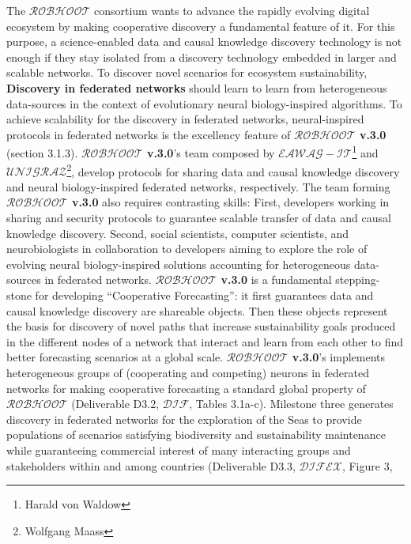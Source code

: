 \documentclass[11pt, a4paper]{article} %
\begin{document}
  The {\bf $\mathcal{ROBHOOT}$} consortium wants to advance the
  rapidly evolving digital ecosystem by making cooperative discovery a
  fundamental feature of it. For this purpose, a science-enabled data
  and causal knowledge discovery technology is not enough if they stay
  isolated from a discovery technology embedded in larger and scalable
  networks. To discover novel scenarios for ecosystem sustainability,
  {\bf Discovery in federated networks} should learn to learn from
  heterogeneous data-sources in the context of evolutionary neural
  biology-inspired algorithms. To achieve scalability for the
  discovery in federated networks, neural-inspired protocols in
  federated networks is the excellency feature of {\bf
    $\mathcal{ROBHOOT}$ v.3.0} (section 3.1.3). {\bf
    $\mathcal{ROBHOOT}$ v.3.0}'s team composed by {\bf
    $\mathcal{EAWAG-IT}$}\footnote{Harald von Waldow} and {\bf
    $\mathcal{UNIGRAZ}$}\footnote{Wolfgang Maass}, develop protocols
  for sharing data and causal knowledge discovery and neural
  biology-inspired federated networks, respectively. The team forming
  {\bf $\mathcal{ROBHOOT}$ v.3.0} also requires contrasting skills:
  First, developers working in sharing and security protocols to
  guarantee scalable transfer of data and causal knowledge
  discovery. Second, social scientists, computer scientists, and
  neurobiologists in collaboration to developers aiming to explore the
  role of evolving neural biology-inspired solutions accounting for
  heterogeneous data-sources in federated networks. {\bf
    $\mathcal{ROBHOOT}$ v.3.0} is a fundamental stepping-stone for
  developing ``Cooperative Forecasting'': it first guarantees data and
  causal knowledge discovery are shareable objects. Then these objects
  represent the basis for discovery of novel paths that increase
  sustainability goals produced in the different nodes of a network
  that interact and learn from each other to find better forecasting
  scenarios at a global scale. {\bf $\mathcal{ROBHOOT}$ v.3.0}'s
  implements heterogeneous groups of (cooperating and competing)
  neurons in federated networks for making cooperative forecasting a
  standard global property of $\mathcal{ROBHOOT}$ (Deliverable D3.2,
  {\bf $\mathcal{DIF}$}, Tables 3.1a-c). Milestone three generates
  discovery in federated networks for the exploration of the Seas to
  provide populations of scenarios satisfying biodiversity and
  sustainability maintenance while guaranteeing commercial interest of
  many interacting groups and stakeholders within and among countries
  (Deliverable D3.3, {\bf $\mathcal{DIFEX}$}, Figure 3,
\end{document}
